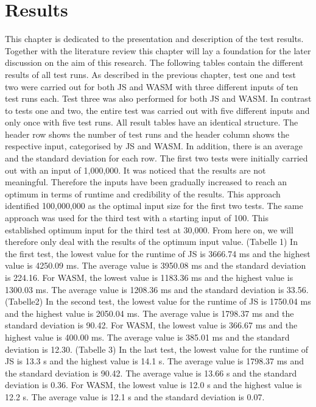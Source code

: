 \newpage
\section{Results} \label{results}
This chapter is dedicated to the presentation and description of the test results. Together with the literature review this chapter will lay a foundation for the later discussion on the aim of this research. The following tables contain the different results of all test runs. As described in the previous chapter, test one and test two were carried out for both JS and WASM with three different inputs of ten test runs each. Test three was also performed for both JS and WASM. In contrast to tests one and two, the entire test was carried out with five different inputs and only once with five test runs.
All result tables have an identical structure. The header row shows the number of test runs and the header column shows the respective input, categorised by JS and WASM. In addition, there is an average and the standard deviation for each row. The first two tests were initially carried out with an input of 1,000,000. It was noticed that the results are not meaningful. Therefore the inputs have been gradually increased to reach an optimum in terms of runtime and credibility of the results. This approach identified 100,000,000 as the optimal input size for the first two tests. The same approach was used for the third test with a starting input of 100. This established optimum input for the third test at 30,000. From here on, we will therefore only deal with the results of the optimum input value.
(Tabelle 1)
In the first test, the lowest value for the runtime of JS is 3666.74 ms and the highest value is 4250.09 ms. The average value is 3950.08 ms and the standard deviation is 224.16. For WASM, the lowest value is 1183.36 ms and the highest value is 1300.03 ms. The average value is 1208.36 ms and the standard deviation is 33.56.
(Tabelle2)
In the second test, the lowest value for the runtime of JS is 1750.04 ms and the highest value is 2050.04 ms. The average value is 1798.37 ms and the standard deviation is 90.42. For WASM, the lowest value is 366.67 ms and the highest value is 400.00 ms. The average value is 385.01 ms and the standard deviation is 12.30.
(Tabelle 3)
In the last test, the lowest value for the runtime of JS is 13.3 s and the highest value is 14.1 s. The average value is 1798.37 ms and the standard deviation is 90.42. The average value is 13.66 s and the standard deviation is 0.36. For WASM, the lowest value is 12.0 s and the highest value is 12.2 s. The average value is 12.1 s and the standard deviation is 0.07.
